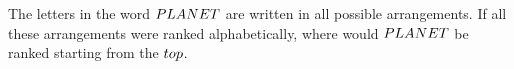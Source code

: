 



\question[3] The letters in the word $PLANET$ are written in all possible 
arrangements. If all these arrangements were ranked alphabetically, where
would $PLANET$ be ranked starting from the $top$.


\watchout

